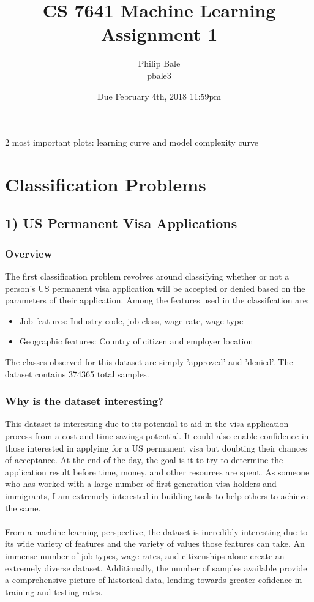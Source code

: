 \documentclass[h]{article}
\title{CS 7641 Machine Learning \\ Assignment 1}
\date{Due February 4th, 2018 11:59pm}
\author{Philip Bale \\ pbale3}
\begin{document}
\maketitle


2 most important plots: learning curve and model complexity curve

\section*{Classification Problems}
\subsection*{1) US Permanent Visa Applications}  
\subsubsection*{Overview}
The first classification problem revolves around classifying whether or not a 
person's US permanent visa application will be accepted or denied based on the parameters of 
their application.  Among the features used in the classifcation are:
\begin{itemize}
  \item Job features: Industry code, job class, wage rate, wage type
  \item Geographic features: Country of citizen and employer location
\end{itemize}
The classes observed for this dataset are simply 'approved' and 'denied'.  The 
dataset contains 374365 total samples.
\subsubsection*{Why is the dataset interesting?}
This dataset is interesting due to its potential to aid in the visa application 
process from a cost and time savings potential.  It could also enable confidence in those 
interested in applying for a US permanent visa but doubting their chances of 
acceptance.  At the end of the day, the goal is it to try to determine the application result 
before time, money, and other resources are spent.  As someone who has worked 
with a large number of first-generation visa holders and immigrants, I am 
extremely interested in building tools to help others to achieve the same.
\\ \\
From a machine learning perspective, the dataset is incredibly interesting due 
to its wide variety of features and the variety of values those features can take. 
 An immense number of job types, wage rates, and citizenships alone create an 
 extremely diverse dataset.  Additionally, the number of samples available 
 provide a comprehensive picture of historical data, lending towards greater 
 cofidence in training and testing rates.
\end{document}
